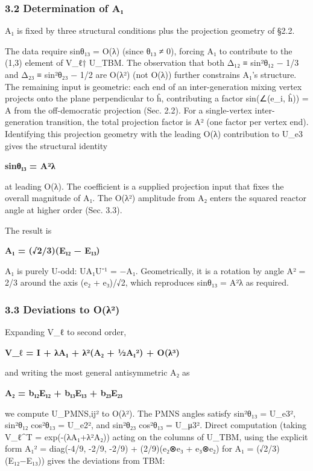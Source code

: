 \documentclass[
]{article}
\begin{document}
\hypertarget{determination-of-aux2081}{%
\subsubsection{3.2 Determination of A₁}\label{determination-of-aux2081}}

A₁ is fixed by three structural conditions plus the projection geometry
of §2.2.

The data require sinθ₁₃ = O(λ) (since θ₁₃ ≠ 0), forcing A₁ to contribute
to the (1,3) element of V\_ℓ† U\_TBM. The observation that both Δ₁₂ ≡
sin²θ₁₂ − 1/3 and Δ₂₃ ≡ sin²θ₂₃ − 1/2 are O(λ²) (not O(λ)) further
constrains A₁'s structure. The remaining input is geometric: each end of
an inter-generation mixing vertex projects onto the plane perpendicular
to ĥ, contributing a factor sin(∠(e\_i, ĥ)) = A from the off-democratic
projection (Sec. 2.2). For a single-vertex inter-generation transition,
the total projection factor is A² (one factor per vertex end).
Identifying this projection geometry with the leading O(λ) contribution
to U\_e3 gives the structural identity

\textbf{sinθ₁₃ = A²λ}

at leading O(λ). The coefficient is a supplied projection input that
fixes the overall magnitude of A₁. The O(λ²) amplitude from A₂ enters
the squared reactor angle at higher order (Sec. 3.3).

The result is

\textbf{A₁ = (√2/3)(E₁₂ − E₁₃)}

A₁ is purely U-odd: UA₁U⁻¹ = −A₁. Geometrically, it is a rotation by
angle A² = 2/3 around the axis (e₂ + e₃)/√2, which reproduces sinθ₁₃ =
A²λ as required.

\hypertarget{deviations-to-oux3bbuxb2}{%
\subsubsection{3.3 Deviations to O(λ²)}\label{deviations-to-oux3bbuxb2}}

Expanding V\_ℓ to second order,

\textbf{V\_ℓ = I + λA₁ + λ²(A₂ + ½A₁²) + O(λ³)}

and writing the most general antisymmetric A₂ as

\textbf{A₂ = b₁₂E₁₂ + b₁₃E₁₃ + b₂₃E₂₃}

we compute \textbar U\_PMNS,ij\textbar² to O(λ²). The PMNS angles
satisfy sin²θ₁₃ = \textbar U\_e3\textbar², sin²θ₁₂ cos²θ₁₃ =
\textbar U\_e2\textbar², and sin²θ₂₃ cos²θ₁₃ = \textbar U\_μ3\textbar².
Direct computation (taking V\_ℓ\^{}T = exp(-(λA₁+λ²A₂)) acting on the
columns of U\_TBM, using the explicit form A₁² = diag(-4/9, -2/9, -2/9)
+ (2/9)(e₂⊗e₃ + e₃⊗e₂) for A₁ = (√2/3)(E₁₂−E₁₃)) gives the deviations
from TBM:
\end{document}
